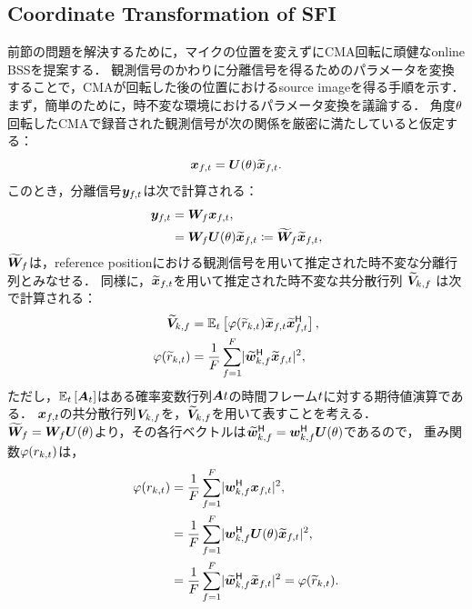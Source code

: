 \documentclass[sip,biber]{now-journal}
\begin{document}
\subsection{Coordinate Transformation of SFI}

前節の問題を解決するために，マイクの位置を変えずにCMA回転に頑健なonline BSSを提案する．
観測信号のかわりに分離信号を得るためのパラメータを変換することで，CMAが回転した後の位置におけるsource imageを得る手順を示す．
まず，簡単のために，時不変な環境におけるパラメータ変換を議論する．
角度$\theta$回転したCMAで録音された観測信号が次の関係を厳密に満たしていると仮定する：
\begin{equation}
  \Obs _{\ft} = \rotMat (\rotSpat) \refpos{\Obs} _{\ft}.
\end{equation}
このとき，分離信号$\Est _{\ft}$は次で計算される：
\begin{align}
  \Est _{\ft} &= \Demix _{\freq} \Obs _{\ft}, \\
              &= \Demix _{\freq} \rotMat (\rotSpat) \refpos{\Obs} _{\ft} \coloneqq \refpos{\Demix} _{\freq} \refpos{\Obs} _{\ft},
\end{align}
$\widetilde{\bm{W}} _{f}$は，reference positionにおける観測信号を用いて推定された時不変な分離行列とみなせる．
同様に，$\refpos{\Obs} _{\ft}$を用いて推定された時不変な共分散行列 $\widetilde{\bm{V}} _{k,f}$ は次で計算される：
\begin{align}
  \refpos{\cov} _{\src,\freq} &= \expct  _{\tframe} \left[\weight (\refpos{\var} _{\src,\tframe}) \refpos{\Obs} _{\ft} \refpos{\Obs} _{\ft} ^{\hermite}\right], \\
  \weight (\refpos{\var} _{\src,\tframe}) &= \frac{1}{\Freq} \sum _{\freq = 1} ^{\Freq} \lvert \refpos{\demix} _{\src,\freq} ^{\hermite} \refpos{\Obs} _{\ft} \rvert ^2,
\end{align}
ただし，$\mathbb{E} _{t}\left[\bm{A} _{t}\right]$はある確率変数行列$\bm{A}{t}$の時間フレーム$t$に対する期待値演算である．
$\Obs _{\ft}$の共分散行列${\bm{V}} _{k,f}$を，$\widetilde{\bm{V}} _{k,f}$を用いて表すことを考える．
$\widetilde{\bm{W}} _{f} = \bm{W} _{f} \bm{U} (\theta)$より，その各行ベクトルは$\widetilde{\bm{w}} _{k,f} ^{\mathsf{H}} = \bm{w} _{k,f} ^{\mathsf{H}} \bm{U} (\theta)$であるので，
重み関数$\varphi(r _{k,t})$は，
\begin{align}
  \weight (\var _{\src,\tframe}) &= \frac{1}{\Freq} \sum _{\freq = 1} ^{\Freq} \lvert \demix _{\src,\freq} ^{\hermite} \Obs _{\ft} \rvert ^2, \\
                                 &= \frac{1}{\Freq} \sum _{\freq = 1} ^{\Freq} \lvert \demix _{\src,\freq} ^{\hermite} \rotMat (\rotSpat) \refpos{\Obs} _{\ft} \rvert ^2, \\
                                 &= \frac{1}{\Freq} \sum _{\freq = 1} ^{\Freq} \lvert \refpos{\demix} _{\src,\freq} ^{\hermite} \refpos{\Obs} _{\ft} \rvert ^2 = \weight (\refpos{\var} _{\src,\tframe}).
\end{align}
\end{document}
